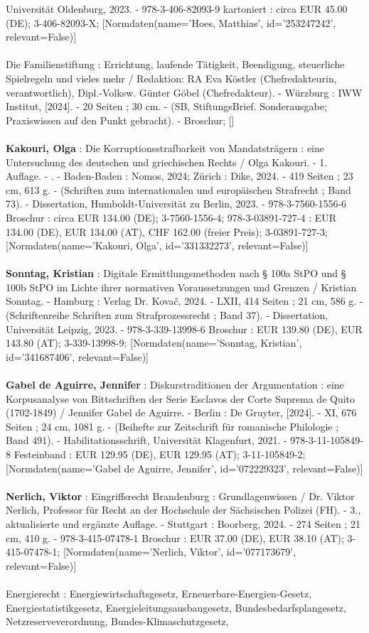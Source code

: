 \documentclass{article}
\begin{document}
\begin{multicols}{3}
Universität Oldenburg, 2023. - 978-3-406-82093-9 kartoniert : circa EUR 45.00 (DE); 3-406-82093-X; [Normdaten(name='Hoes, Matthias', id='253247242', relevant=False)]\\\\Die Familienstiftung : Errichtung, laufende Tätigkeit, Beendigung, steuerliche Spielregeln und vieles mehr / Redaktion: RA Eva Köstler (Chefredakteurin, verantwortlich), Dipl.-Volksw. Günter Göbel (Chefredakteur). - Würzburg : IWW Institut, [2024]. - 20 Seiten ; 30 cm. - (SB, StiftungsBrief. Sonderausgabe; Praxiswissen auf den Punkt gebracht). - Broschur; []\\\\\textbf{Kakouri, Olga} : Die Korruptionsstrafbarkeit von Mandatsträgern : eine Untersuchung des deutschen und griechischen Rechts / Olga Kakouri. - 1. Auflage. - . - Baden-Baden : Nomos, 2024; Zürich : Dike, 2024. - 419 Seiten ; 23 cm, 613 g. - (Schriften zum internationalen und europäischen Strafrecht ; Band 73). - Dissertation, Humboldt-Universität zu Berlin, 2023. - 978-3-7560-1556-6 Broschur : circa EUR 134.00 (DE); 3-7560-1556-4; 978-3-03891-727-4 : EUR 134.00 (DE), EUR 134.00 (AT), CHF 162.00 (freier Preis); 3-03891-727-3; [Normdaten(name='Kakouri, Olga', id='331332273', relevant=False)]\\\\\textbf{Sonntag, Kristian} : Digitale Ermittlungsmethoden nach § 100a StPO und § 100b StPO im Lichte ihrer normativen Voraussetzungen und Grenzen / Kristian Sonntag. - Hamburg : Verlag Dr. Kovač, 2024. - LXII, 414 Seiten ; 21 cm, 586 g. - (Schriftenreihe Schriften zum Strafprozessrecht ; Band 37). - Dissertation, Universität Leipzig, 2023. - 978-3-339-13998-6 Broschur : EUR 139.80 (DE), EUR 143.80 (AT); 3-339-13998-9; [Normdaten(name='Sonntag, Kristian', id='341687406', relevant=False)]\\\\\textbf{Gabel de Aguirre, Jennifer} : Diskurstraditionen der Argumentation : eine Korpusanalyse von Bittschriften der Serie Esclavos der Corte Suprema de Quito (1702-1849) / Jennifer Gabel de Aguirre. - Berlin : De Gruyter, [2024]. - XI, 676 Seiten ; 24 cm, 1081 g. - (Beihefte zur Zeitschrift für romanische Philologie ; Band 491). - Habilitationsschrift, Universität Klagenfurt, 2021. - 978-3-11-105849-8 Festeinband : EUR 129.95 (DE), EUR 129.95 (AT); 3-11-105849-2; [Normdaten(name='Gabel de Aguirre, Jennifer', id='072229323', relevant=False)]\\\\\textbf{Nerlich, Viktor} : Eingriffsrecht Brandenburg : Grundlagenwissen / Dr. Viktor Nerlich, Professor für Recht an der Hochschule der Sächsischen Polizei (FH). - 3., aktualisierte und ergänzte Auflage. - Stuttgart : Boorberg, 2024. - 274 Seiten ; 21 cm, 410 g. - 978-3-415-07478-1 Broschur : EUR 37.00 (DE), EUR 38.10 (AT); 3-415-07478-1; [Normdaten(name='Nerlich, Viktor', id='077173679', relevant=False)]\\\\Energierecht : Energiewirtschaftsgesetz, Erneuerbare-Energien-Gesetz, Energiestatistikgesetz, Energieleitungsausbaugesetz, Bundesbedarfsplangesetz, Netzreserveverordnung, Bundes-Klimaschutzgesetz, 
\end{multicols}
\end{document}
